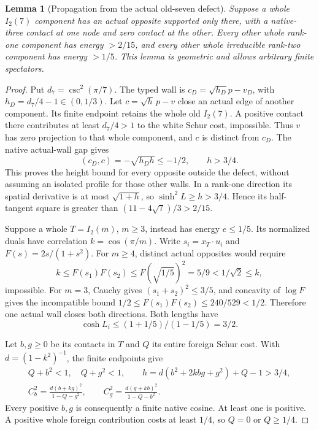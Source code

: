 \documentclass[11pt]{article}
\newtheorem{lemma}[theorem]{Lemma}
\begin{document}
\begin{lemma}[Propagation from the actual old-seven defect]
\label{lem:O7propagation}
Suppose a whole $I_2(7)$ component has an actual opposite supported
only there, with a native-three contact at one node and zero contact
at the other. Every other whole rank-one component has energy
$>2/15$, and every other whole irreducible rank-two component has
energy $>1/5$. This lemma is geometric and allows arbitrary finite
spectators.
\end{lemma}
\begin{proof}
Put $d_7=\csc^2(\pi/7)$. The typed wall is
$c_D=\sqrt{h_D}p-v_D$, with
$h_D=d_7/4-1\in(0,1/3)$.
Let $c=\sqrt h\,p-v$ close an actual edge of another component.
Its finite endpoint retains the whole old $I_2(7)$.
A positive contact there contributes at least $d_7/4>1$ to the
white Schur cost, impossible. Thus $v$ has zero projection to
that whole component, and $c$ is distinct from $c_D$.
The native actual-wall gap gives
\begin{equation}\label{eq:O7height}
 (c_D,c)=-\sqrt{h_Dh}\le-1/2,\qquad h>3/4 .
\end{equation}
This proves the height bound for every opposite outside the defect,
without assuming an isolated profile for those other walls.
In a rank-one direction its spatial derivative is at most
$\sqrt{1+h}$, so $\sinh^2L\ge h>3/4$. Hence its half-tangent
square is greater than $(11-4\sqrt7)/3>2/15$.

Suppose a whole $T=I_2(m)$, $m\ge3$, instead has energy $e\le1/5$.
Its normalized duals have correlation $k=\cos(\pi/m)$.
Write $s_i=x_T\cdot u_i$ and $F(s)=2s/(1+s^2)$.
For $m\ge4$, distinct actual opposites would require
\[
 k\le F(s_1)F(s_2)\le F(\sqrt{1/5})^2
   =5/9<1/\sqrt2\le k,
\]
impossible. For $m=3$, Cauchy gives $(s_1+s_2)^2\le3/5$,
and concavity of $\log F$ gives the incompatible bound
$1/2\le F(s_1)F(s_2)\le240/529<1/2$.
Therefore one actual wall closes both directions. Both lengths have
\begin{equation}\label{eq:O7length}
 \cosh L_i\le(1+1/5)/(1-1/5)=3/2 .
\end{equation}

Let $b,g\ge0$ be its contacts in $T$ and $Q$ its entire foreign
Schur cost. With $d=(1-k^2)^{-1}$, the finite endpoints give
\[
\begin{gathered}
 Q+b^2<1,\quad Q+g^2<1,\qquad
 h=d(b^2+2kbg+g^2)+Q-1>3/4,\\
 C_b^2=\frac{d(b+kg)^2}{1-Q-g^2},\qquad
 C_g^2=\frac{d(g+kb)^2}{1-Q-b^2}.
\end{gathered}
\]
Every positive $b,g$ is consequently a finite native cosine.
At least one is positive. A positive whole foreign contribution
costs at least $1/4$, so $Q=0$ or $Q\ge1/4$.


\end{proof}
\end{document}
